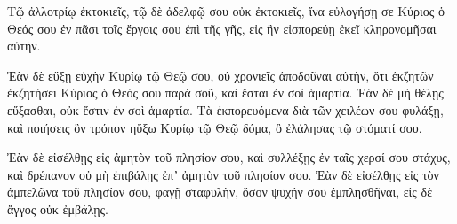{Τῷ ἀλλοτρίῳ ἐκτοκιεῖς, τῷ δὲ ἀδελφῷ σου οὐκ ἐκτοκιεῖς, ἵνα εὐλογήσῃ σε Κύριος ὁ Θεός σου ἐν πᾶσι τοῖς ἔργοις σου ἐπὶ τῆς γῆς, εἰς ἣν εἰσπορεύῃ ἐκεῖ κληρονομῆσαι αὐτήν.
\par }{\PP {}Ἐὰν δὲ εὔξῃ εὐχὴν Κυρίῳ τῷ Θεῷ σου, οὐ χρονιεῖς ἀποδοῦναι αὐτὴν, ὅτι ἐκζητῶν ἐκζητήσει Κύριος ὁ Θεός σου παρὰ σοῦ, καὶ ἔσται ἐν σοὶ ἁμαρτία.
Ἐὰν δὲ μὴ θέλῃς εὔξασθαι, οὐκ ἔστιν ἐν σοὶ ἁμαρτία.
Τὰ ἐκπορευόμενα διὰ τῶν χειλέων σου φυλάξῃ, καὶ ποιήσεις ὃν τρόπον ηὔξω Κυρίῳ τῷ Θεῷ δόμα, ὃ ἐλάλησας τῷ στόματί σου.
\par }{\PP {}Ἐὰν δὲ εἰσέλθῃς εἰς ἀμητὸν τοῦ πλησίον σου, καὶ συλλέξῃς ἐν ταῖς χερσί σου στάχυς, καὶ δρέπανον οὐ μὴ ἐπιβάλῃς ἐπʼ ἀμητὸν τοῦ πλησίον σου.
Ἐὰν δὲ εἰσέλθῃς εἰς τὸν ἀμπελῶνα τοῦ πλησίον σου, φαγῇ σταφυλὴν, ὅσον ψυχήν σου ἐμπλησθῆναι, εἰς δὲ ἄγγος οὐκ ἐμβάλῃς.

}
